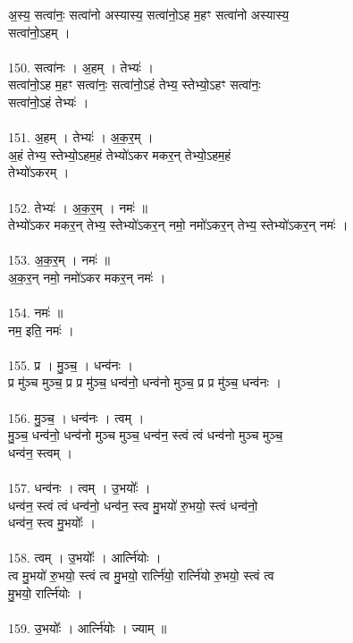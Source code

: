 अ॒स्य॒ सत्वा॑नः॒ सत्वा॑नो अस्यास्य॒ सत्वा॑नो॒ऽह म॒हꣳ सत्वा॑नो अस्यास्य॒\\
सत्वा॑नो॒ऽहम् ।\\
\\
150. सत्वा॑नः । अ॒हम् । तेभ्यः॑ ।\\
सत्वा॑नो॒ऽह म॒हꣳ सत्वा॑नः॒ सत्वा॑नो॒ऽहं तेभ्य॒ स्तेभ्यो॒ऽहꣳ सत्वा॑नः॒\\
सत्वा॑नो॒ऽहं तेभ्यः॑ ।\\
\\
151. अ॒हम् । तेभ्यः॑ । अ॒क॒र॒म् ।\\
अ॒हं तेभ्य॒ स्तेभ्यो॒ऽहम॒हं तेभ्यो॑ऽकर मकर॒न् तेभ्यो॒ऽहम॒हं\\
तेभ्यो॑ऽकरम् ।\\
\\
152. तेभ्यः॑ । अ॒क॒र॒म् । नमः॑ ॥\\
तेभ्यो॑ऽकर मकर॒न् तेभ्य॒ स्तेभ्यो॑ऽकर॒न् नमो॒ नमो॑ऽकर॒न् तेभ्य॒ स्तेभ्यो॑ऽकर॒न् नमः॑ ।\\
\\
153. अ॒क॒र॒म् । नमः॑ ॥\\
अ॒क॒र॒न् नमो॒ नमो॑ऽकर मकर॒न् नमः॑ ।\\
\\
154. नमः॑ ॥\\
नम॒ इति॒ नमः॑ ।\\
\\
155. प्र । मु॒ञ्च॒ । धन्व॑नः ।\\
प्र मु॑ञ्च मुञ्च॒ प्र प्र मु॑ञ्च॒ धन्व॑नो॒ धन्व॑नो मुञ्च॒ प्र प्र मु॑ञ्च॒ धन्व॑नः ।\\
\\
156. मु॒ञ्च॒ । धन्व॑नः । त्वम् ।\\
मु॒ञ्च॒ धन्व॑नो॒ धन्व॑नो मुञ्च मुञ्च॒ धन्व॑न॒ स्त्वं त्वं धन्व॑नो मुञ्च मुञ्च॒\\
धन्व॑न॒ स्त्वम् ।\\
\\
157. धन्व॑नः । त्वम् । उ॒भयोः᳚ ।\\
धन्व॑न॒ स्त्वं त्वं धन्व॑नो॒ धन्व॑न॒ स्त्व मु॒भयो॑ रु॒भयो॒ स्त्वं धन्व॑नो॒\\
धन्व॑न॒ स्त्व मु॒भयोः᳚ ।\\
\\
158. त्वम् । उ॒भयोः᳚ । आर्त्नि॑योः ।\\
त्व मु॒भयो॑ रु॒भयो॒ स्त्वं त्व मु॒भयो॒ रार्त्नि॑यो॒ रार्त्नि॑यो रु॒भयो॒ स्त्वं त्व\\
मु॒भयो॒ रार्त्नि॑योः ।\\
\\
159. उ॒भयोः᳚ । आर्त्नि॑योः । ज्याम् ॥\\
